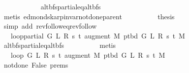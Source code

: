 \begin{isabellebody}
\ \ \ \ \ \ \ \ \ \ \isamarkupfalse%
\ alt{\isacharunderscore}{\kern0pt}bfs{\isacharunderscore}{\kern0pt}partial{\isacharunderscore}{\kern0pt}eq{\isacharunderscore}{\kern0pt}alt{\isacharunderscore}{\kern0pt}bfs\isanewline
\ \ \ \ \ \ \ \ \ \ \isamarkupfalse%
\ {\isacharparenleft}{\kern0pt}metis\ edmonds{\isacharunderscore}{\kern0pt}karp{\isacharunderscore}{\kern0pt}invar{\isacharunderscore}{\kern0pt}not{\isacharunderscore}{\kern0pt}done{\isacharunderscore}{\kern0pt}{}{\isachardot}{\kern0pt}parent{\isacharparenright}{\kern0pt}\isanewline
\ \ \ \ \ \ \ \ \isamarkupfalse%
\ {\isacharquery}{\kern0pt}thesis\isanewline
\ \ \ \ \ \ \ \ \ \ \isamarkupfalse%
\ {\isacharparenleft}{\kern0pt}simp\ add{\isacharcolon}{\kern0pt}\ rev{\isacharunderscore}{\kern0pt}follow{\isacharunderscore}{\kern0pt}eq{\isacharunderscore}{\kern0pt}rev{\isacharunderscore}{\kern0pt}follow{\isacharparenright}{\kern0pt}\isanewline
\ \ \ \ \ \ \isamarkupfalse%
\isanewline
\ \ \ \ \ \ \isamarkupfalse%
\ \isamarkupfalse%
\ {\isachardoublequoteopen}{\isachardot}{\kern0pt}{\isachardot}{\kern0pt}{\isachardot}{\kern0pt}\ {\isacharequal}{\kern0pt}\ loop{\isacharprime}{\kern0pt}{\isacharunderscore}{\kern0pt}partial\ G\ L\ R\ s\ t\ {\isacharparenleft}{\kern0pt}augment\ M\ {\isacharparenleft}{\kern0pt}p{\isacharunderscore}{\kern0pt}tbd\ G\ L\ R\ s\ t\ M{\isacharparenright}{\kern0pt}{\isacharparenright}{\kern0pt}{\isachardoublequoteclose}\isanewline
\ \ \ \ \ \ \ \ \isamarkupfalse%
\ alt{\isacharunderscore}{\kern0pt}bfs{\isacharunderscore}{\kern0pt}partial{\isacharunderscore}{\kern0pt}eq{\isacharunderscore}{\kern0pt}alt{\isacharunderscore}{\kern0pt}bfs\isanewline
\ \ \ \ \ \ \ \ \isamarkupfalse%
\ metis\isanewline
\ \ \ \ \ \ \isamarkupfalse%
\ \isamarkupfalse%
\ {\isachardoublequoteopen}{\isachardot}{\kern0pt}{\isachardot}{\kern0pt}{\isachardot}{\kern0pt}\ {\isacharequal}{\kern0pt}\ loop{\isacharprime}{\kern0pt}\ G\ L\ R\ s\ t\ {\isacharparenleft}{\kern0pt}augment\ M\ {\isacharparenleft}{\kern0pt}p{\isacharunderscore}{\kern0pt}tbd\ G\ L\ R\ s\ t\ M{\isacharparenright}{\kern0pt}{\isacharparenright}{\kern0pt}{\isachardoublequoteclose}\isanewline
\ \ \ \ \ \ \ \ \isamarkupfalse%
\ not{\isacharunderscore}{\kern0pt}done{\isacharunderscore}{\kern0pt}{}\ False\ {\isachardoublequoteopen}{}{\isachardot}{\kern0pt}prems{\isachardoublequoteclose}\isanewline
\ \ \ \ \ \ \ \ \isamarkupfalse%

\end{isabellebody}
